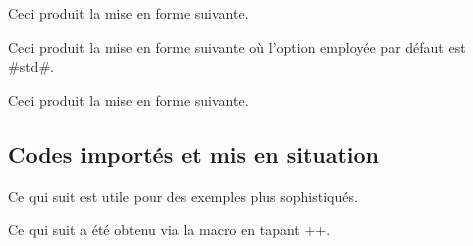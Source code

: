 \documentclass[10pt, a4paper]{article}
\begin{document}


\begin{bdocexa}
    \leavevmode

    \begin{bdoclatex}[code]
    \end{bdoclatex}

    Ceci produit la mise en forme suivante.

\end{bdocexa}




\begin{bdocexa}[À la suite]
    \leavevmode

    \begin{bdoclatex}[code]
    \end{bdoclatex}

    Ceci produit la mise en forme suivante où l'option employée par défaut est \bdocinlatex#std#.

\end{bdocexa}




\begin{bdocexa}
    \leavevmode

    \begin{bdoclatex}[code]
    \end{bdoclatex}

    Ceci produit la mise en forme suivante.

\end{bdocexa}




\subsection{Codes importés et mis en situation} \label{bdoc-latexshow}

Ce qui suit est utile pour des exemples plus sophistiqués.

\begin{bdocexa}[Showcase]
    Ce qui suit a été obtenu via la macro  en tapant \bdocinlatex++.

    \medskip

    \begin{bdoc-doc-showcase}
    \end{bdoc-doc-showcase}
\end{bdocexa}
\end{document}
